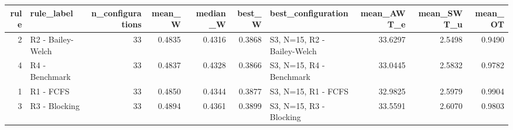 \begin{tabular}{rlrrrrlrrr}
\toprule
rule & rule_label & n_configurations & mean_W & median_W & best_W & best_configuration & mean_AWT_e & mean_SWT_u & mean_OT \\
\midrule
2 & R2 - Bailey-Welch & 33 & 0.4835 & 0.4316 & 0.3868 & S3, N=15, R2 - Bailey-Welch & 33.6297 & 2.5498 & 0.9490 \\
4 & R4 - Benchmark & 33 & 0.4837 & 0.4328 & 0.3866 & S3, N=15, R4 - Benchmark & 33.0445 & 2.5832 & 0.9782 \\
1 & R1 - FCFS & 33 & 0.4850 & 0.4344 & 0.3877 & S3, N=15, R1 - FCFS & 32.9825 & 2.5979 & 0.9904 \\
3 & R3 - Blocking & 33 & 0.4894 & 0.4361 & 0.3899 & S3, N=15, R3 - Blocking & 33.5591 & 2.6070 & 0.9803 \\
\bottomrule
\end{tabular}
